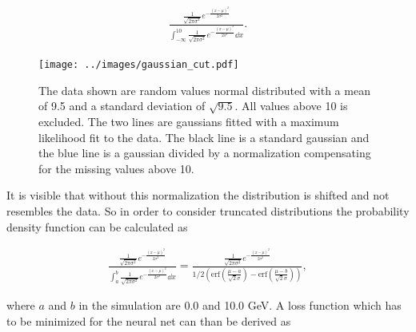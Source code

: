 \documentclass[12pt, a4paper]{thesis}
\begin{document}
\begin{align}
\frac{\frac{1}{\sqrt{2\pi \sigma^2}} e^{-\frac{(x-\mu)^2}{2
      \sigma^2}}}{\int^{10}_{-\infty} \frac{1}{\sqrt{2\pi \sigma^2}}
  e^{-\frac{(x-\mu)^2}{2 \sigma^2}} \dd x}.
\end{align}

\begin{figure}[hbtp]
  \centering
  \texttt{[image: ../images/gaussian\_cut.pdf]}
  \caption{The data shown are random values normal distributed with a
    mean of 9.5 and a standard deviation of $\sqrt{9.5}$. All values
    above 10 is excluded. The two lines are gaussians fitted with a
    maximum likelihood fit to the data. The black line is a standard
    gaussian and the blue line is a gaussian divided by a
    normalization compensating for the missing values above 10.}
  \label{gaussian-cut}
\end{figure}


It is visible that without this normalization the distribution is
shifted and not resembles the data. So in order to consider truncated
distributions the probability density function can be calculated as

\begin{align}
\frac{\frac{1}{\sqrt{2\pi \sigma^2}}
  e^{-\frac{(x-\mu)^2}{2 \sigma^2}}}{\int^b_a \frac{1}{\sqrt{2\pi
      \sigma^2}} e^{-\frac{(x-\mu)^2}{2 \sigma^2}} \dd x} =
\frac{\frac{1}{\sqrt{2\pi \sigma^2}} e^{-\frac{(x-\mu)^2}{2
      \sigma^2}}}{1/2\left(\text{erf}\left(\frac{\mu-a}{\sqrt{2}\sigma}\right)
  - \text{erf}\left(\frac{\mu-b}{\sqrt{2}\sigma}\right)\right)},
\end{align}

where \(a\) and \(b\) in the simulation are 0.0 and 10.0 GeV. A loss
function which has to be minimized for the neural net can than be
derived as
\end{document}
